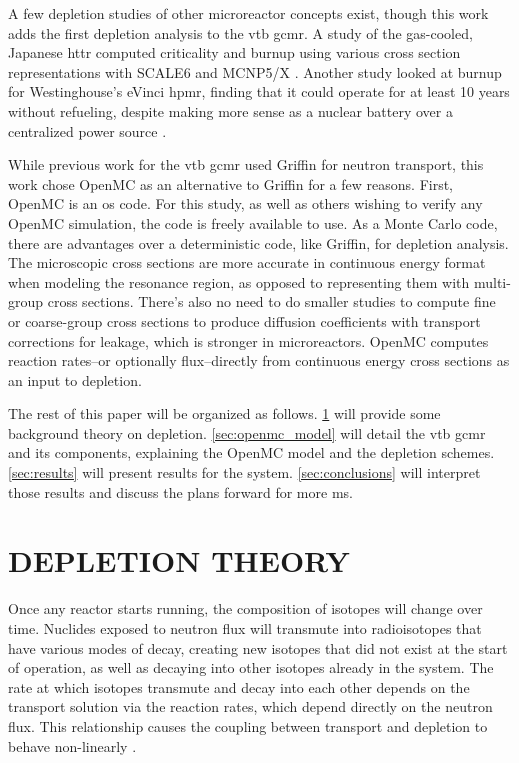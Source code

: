 \documentclass[letterpaper]{physor2024}
\begin{document}
A few depletion studies of other microreactor concepts exist, though this work adds the first depletion analysis to the \gls{vtb} \gls{gcmr}. A study of the gas-cooled, Japanese \gls{httr} computed criticality and burnup using various cross section representations with SCALE6 and MCNP5/X \cite{chiang-gcmr}. Another study looked at burnup for Westinghouse's eVinci \gls{hpmr}, finding that it could operate for at least 10 years without refueling, despite making more sense as a nuclear battery over a centralized power source \cite{Hernandez-hpmr}.

While previous work for the \gls{vtb} \gls{gcmr} used Griffin for neutron transport, this work chose OpenMC as an alternative to Griffin for a few reasons. First, OpenMC is an \gls{os} code. For this study, as well as others wishing to verify any OpenMC simulation, the code is freely available to use. As a Monte Carlo code, there are advantages over a deterministic code, like Griffin, for depletion analysis. The microscopic cross sections  are more accurate in continuous energy format when modeling the resonance region, as opposed to representing them with multi-group cross sections. There's also no need to do smaller studies to compute fine or coarse-group cross sections to produce diffusion coefficients with transport corrections for leakage, which is stronger in microreactors. OpenMC computes reaction rates--or optionally flux--directly from continuous energy cross sections as an input to depletion.

The rest of this paper will be organized as follows. \cref{sec:depletion} will provide some background theory on depletion. \cref{sec:openmc_model}  will detail the \gls{vtb} \gls{gcmr} and its components, explaining the OpenMC model and the depletion schemes. \cref{sec:results} will present results for the system. \cref{sec:conclusions} will interpret those results and discuss the plans forward for more \gls{ms}.

\section{DEPLETION THEORY}\label{sec:depletion}
Once any reactor starts running, the composition of isotopes will change over time. Nuclides exposed to neutron flux will transmute into radioisotopes that have various modes of decay, creating new isotopes that did not exist at the start of operation, as well as decaying into other isotopes already in the system. The rate at which isotopes transmute and decay into each other depends on the transport solution via the reaction rates, which depend directly on the neutron flux. This relationship causes the coupling between transport and depletion to behave non-linearly \cite{romano-depletion-2021}.
\end{document}
